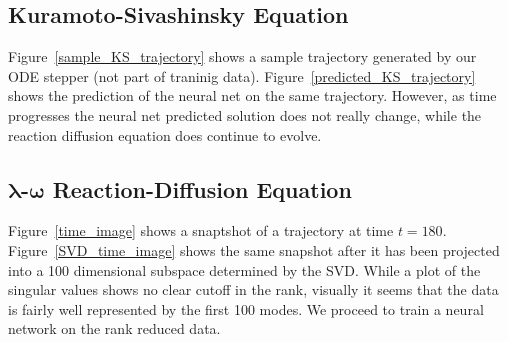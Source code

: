 \documentclass[10pt]{article}
\begin{document}
\subsection{Kuramoto-Sivashinsky Equation}

Figure~\ref{sample_KS_trajectory} shows a sample trajectory generated by our ODE stepper (not part of traninig data). Figure~\ref{predicted_KS_trajectory} shows the prediction of the neural net on the same trajectory. However, as time progresses the neural net predicted solution does not really change, while the reaction diffusion equation does continue to evolve.


\subsection{ \( \boldsymbol\lambda \)-\( \boldsymbol\omega \) Reaction-Diffusion Equation}
Figure~\ref{time_image} shows a snaptshot of a trajectory at time \( t=180 \). Figure~\ref{SVD_time_image} shows the same snapshot after it has been projected into a 100 dimensional subspace determined by the SVD. While a plot of the singular values shows no clear cutoff in the rank, visually it seems that the data is fairly well represented by the first 100 modes. We proceed to train a neural network on the rank reduced data.
\end{document}
